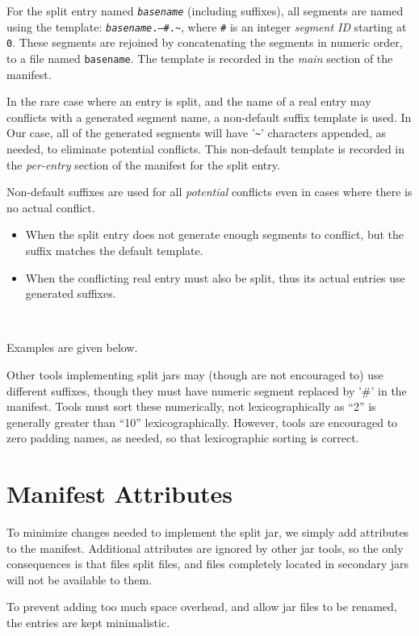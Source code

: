 \documentclass[a4paper, 12pt, pdftex]{report}
\begin{document}
For the split entry named \texttt{\emph{basename}} (including
suffixes), all segments are named using the template:
\texttt{\emph{basename}}\texttt{.---\#.\~{}}, where \texttt{\#} is an integer
\emph{segment ID} starting at \texttt{0}. These segments are
rejoined by concatenating the segments in numeric order, to a file
named \texttt{basename}. The template is recorded in the \emph{main} section
of the manifest.

In the rare case where an entry is split, and the name of a real entry
may conflicts with a generated segment name, a non-default suffix
template is used. In Our case, all of the generated segments will have
'\texttt{\~{}}' characters appended, as needed, to eliminate potential
conflicts. This non-default template is recorded in the
\emph{per-entry} section of the manifest for the split entry.

Non-default suffixes are used for all \emph{potential} conflicts even in
cases where there is no actual conflict.

\begin{itemize}
  \item When the split entry does not generate enough segments to
        conflict, but the suffix matches the default template.
  \item When the conflicting real entry must also be split, thus its
        actual entries use generated suffixes.
\end{itemize}\

Examples are given below.

Other tools implementing split jars may (though are not encouraged to)
use different suffixes, though they must have numeric segment replaced
by '\#' in the manifest. Tools must sort these numerically, not
lexicographically as ``2'' is generally greater than ``10''
lexicographically. However, tools are encouraged to zero padding names,
as needed, so that lexicographic sorting is correct.

\section{Manifest Attributes}

To minimize changes needed to implement the split jar, we simply add
attributes to the manifest. Additional attributes are ignored by other
jar tools, so the only consequences is that files split files, and
files completely located in secondary jars will not be available to
them.

To prevent adding too much space overhead, and allow jar files to be
renamed, the entries are kept minimalistic.
\end{document}
